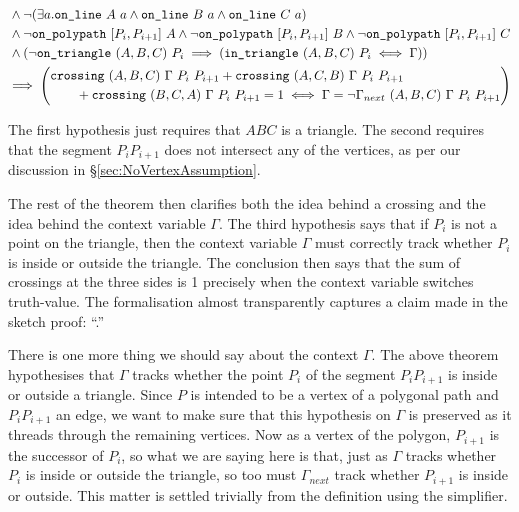 \begin{multline}
  \begin{aligned}
    &\wedge \Triangle{a}{A}{B}{C}\\
    &\wedge \neg\code{on\_polypath}\ [P_i,P_{i+1}]\ A\wedge \neg\code{on\_polypath}\ [P_i,P_{i+1}]\ B\wedge \neg\code{on\_polypath}\ [P_i,P_{i+1}]\ C\\
    &\wedge(\neg\code{on\_triangle}\ (A,B,C)\ P_i \implies (\code{in\_triangle}\ (A,B,C)\ P_i \iff \Gamma))\\
  \end{aligned}\\
    \implies\left(\begin{aligned}[]
        &\code{crossing}\ (A,B,C)\ \Gamma\ P_i\ P_{i+1} + \code{crossing}\ (A,C,B)\ \Gamma\ P_i\ P_{i+1}\\
          &\qquad+ \code{crossing}\ (B,C,A)\ \Gamma\ P_i\ P_{i+1} = 1  \iff \Gamma = \neg \Gamma_{next}\ (A,B,C)\ \Gamma\ P_i\ P_{i+1}
        \end{aligned}\right)
\end{multline}

The first hypothesis just requires that $ABC$ is a triangle. The second requires that the segment $P_iP_{i+1}$ does not intersect any of the vertices, as per our discussion in \S\ref{sec:NoVertexAssumption}. 

The rest of the theorem then clarifies both the idea behind a crossing and the idea behind the context variable $\Gamma$. The third hypothesis says that if $P_i$ is not a point on the triangle, then the context variable $\Gamma$ must correctly track whether $P_i$ is inside or outside the triangle. The conclusion then says that the sum of crossings at the three sides is 1 precisely when the context variable switches truth-value. The formalisation almost transparently captures a claim made in the sketch proof: ``\insideoutsideclaim.''

There is one more thing we should say about the context $\Gamma$. The above theorem hypothesises that $\Gamma$ tracks whether the point $P_i$ of the segment $P_iP_{i+1}$ is inside or outside a triangle. Since $P$ is intended to be a vertex of a polygonal path and $P_iP_{i+1}$ an edge, we want to make sure that this hypothesis on $\Gamma$ is preserved as it threads through the remaining vertices. Now as a vertex of the polygon, $P_{i+1}$ is the successor of $P_i$, so what we are saying here is that, just as $\Gamma$ tracks whether $P_i$ is inside or outside the triangle, so too must $\Gamma_{next}$ track whether $P_{i+1}$ is inside or outside. This matter is settled trivially from the definition using the simplifier.


